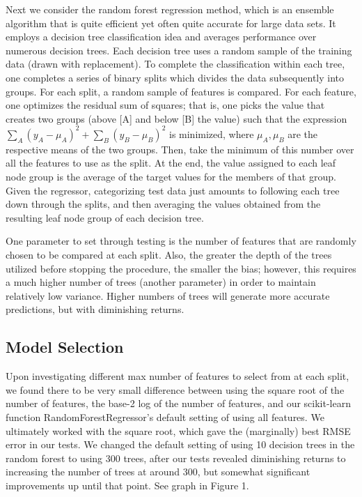 \documentclass{article}
\begin{document}
Next we consider the random forest regression method, which is an ensemble algorithm that is quite efficient yet often quite accurate for large data sets. It employs a decision tree classification idea and averages performance over numerous decision trees. Each decision tree uses a random sample of the training data (drawn with replacement). To complete the classification within each tree, one completes a series of binary splits which divides the data subsequently into groups. For each split, a random sample of features is compared. For each feature, one optimizes the residual sum of squares; that is, one picks the value that creates two groups (above [A] and below [B] the value) such that the expression $\sum_A (y_A - \mu _A)^2 + \sum_B (y_B - \mu _B)^2$ is minimized, where $\mu _A, \mu _B$ are the respective means of the two groups. Then, take the minimum of this number over all the features to use as the split. At the end, the value assigned to each leaf node group is the average of the target values for the members of that group. Given the regressor, categorizing test data just amounts to following each tree down through the splits, and then averaging the values obtained from the resulting leaf node group of each decision tree.

One parameter to set through testing is the number of features that are randomly chosen to be compared at each split. Also, the greater the depth of the trees utilized before stopping the procedure, the smaller the bias; however, this requires a much higher number of trees (another parameter) in order to maintain relatively low variance. Higher numbers of trees will generate more accurate predictions, but with diminishing returns.


\subsection{Model Selection}

Upon investigating different max number of features to select from at each split, we found there to be very small difference between using the square root of the number of features, the base-2 log of the number of features, and our scikit-learn function RandomForestRegressor's default setting of using all features. We ultimately worked with the square root, which gave the (marginally) best RMSE error in our tests. We changed the default setting of using 10 decision trees in the random forest to using 300 trees, after our tests revealed diminishing returns to increasing the number of trees at around 300, but somewhat significant improvements up until that point. See graph in Figure 1.
\end{document}
